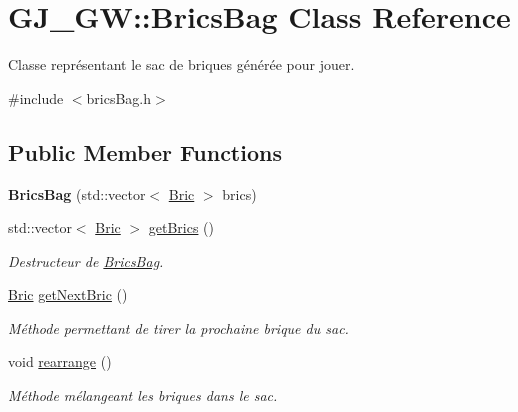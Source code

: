 \hypertarget{class_g_j___g_w_1_1_brics_bag}{}\section{G\+J\+\_\+\+GW\+:\+:Brics\+Bag Class Reference}
\label{class_g_j___g_w_1_1_brics_bag}


Classe représentant le sac de briques générée pour jouer.  




{\ttfamily \#include $<$brics\+Bag.\+h$>$}

\subsection*{Public Member Functions}
\begin{DoxyCompactItemize}
\item 
\hypertarget{class_g_j___g_w_1_1_brics_bag_ac0a01a2cfc202e467bd0a5f5a1143552}{}\label{class_g_j___g_w_1_1_brics_bag_ac0a01a2cfc202e467bd0a5f5a1143552} 
{\bfseries Brics\+Bag} (std\+::vector$<$ \hyperlink{class_g_j___g_w_1_1_bric}{Bric} $>$ brics)
\item 
std\+::vector$<$ \hyperlink{class_g_j___g_w_1_1_bric}{Bric} $>$ \hyperlink{class_g_j___g_w_1_1_brics_bag_aace245eacf3ee57e2969b82409cd377a}{get\+Brics} ()
\begin{DoxyCompactList}\small\item\em Destructeur de \hyperlink{class_g_j___g_w_1_1_brics_bag}{Brics\+Bag}. \end{DoxyCompactList}\item 
\hyperlink{class_g_j___g_w_1_1_bric}{Bric} \hyperlink{class_g_j___g_w_1_1_brics_bag_a0b7de0635ac188c140fc94b7a7632ca8}{get\+Next\+Bric} ()
\begin{DoxyCompactList}\small\item\em Méthode permettant de tirer la prochaine brique du sac. \end{DoxyCompactList}\item 
\hypertarget{class_g_j___g_w_1_1_brics_bag_a87c0f05f000e3bc415c0dd9ae1e9c7ae}{}\label{class_g_j___g_w_1_1_brics_bag_a87c0f05f000e3bc415c0dd9ae1e9c7ae} 
void \hyperlink{class_g_j___g_w_1_1_brics_bag_a87c0f05f000e3bc415c0dd9ae1e9c7ae}{rearrange} ()
\begin{DoxyCompactList}\small\item\em Méthode mélangeant les briques dans le sac. \end{DoxyCompactList}\end{DoxyCompactItemize}


